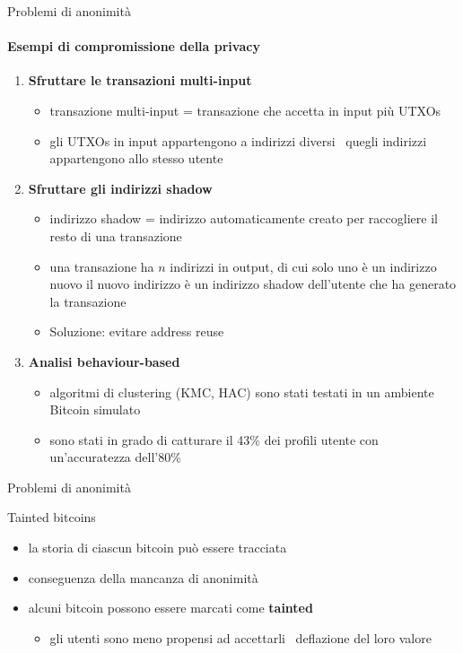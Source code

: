\documentclass{beamer}
\begin{document}
  
  
  \begin{frame}{Problemi di anonimità}
  \framesubtitle{Esempi di compromissione della privacy}
      \begin{enumerate}
          \item \textbf{Sfruttare le transazioni multi-input}
          \begin{itemize}
              \item transazione multi-input = transazione che accetta in input più UTXOs 
              \item gli UTXOs in input appartengono a indirizzi diversi \MVRightarrow\, quegli indirizzi appartengono allo stesso utente
          \end{itemize}
          \pause
          \item \textbf{Sfruttare gli indirizzi shadow}
          \begin{itemize}
              \item indirizzo shadow = indirizzo automaticamente creato per raccogliere il resto di una transazione
              \item una transazione ha $n$ indirizzi in output, di cui solo uno è un indirizzo nuovo \MVRightarrow il nuovo indirizzo è un indirizzo shadow dell'utente che ha generato la transazione
              \item Soluzione: evitare address reuse 
          \end{itemize}
          \pause
          \item \textbf{Analisi behaviour-based}
          \begin{itemize}
              \item algoritmi di clustering (KMC, HAC) sono stati testati in un ambiente Bitcoin simulato \cite{androulaki2013evaluating}
              \item sono stati in grado di catturare il 43\% dei profili utente con un'accuratezza dell'80\% 
          \end{itemize}
      \end{enumerate}
  \end{frame}
  
  
  
  \begin{frame}{Problemi di anonimità}
      \begin{block}{Tainted bitcoins}
        \begin{itemize}
            \item la storia di ciascun bitcoin può essere tracciata
            \item conseguenza della mancanza di anonimità
            \item alcuni bitcoin possono essere marcati come \textbf{tainted}
            \begin{itemize}
                \item gli utenti sono meno propensi ad accettarli \MVRightarrow\, deflazione del loro valore
            \end{itemize}
        \end{itemize}
      \end{block}
  \end{frame}
  
\end{document}

